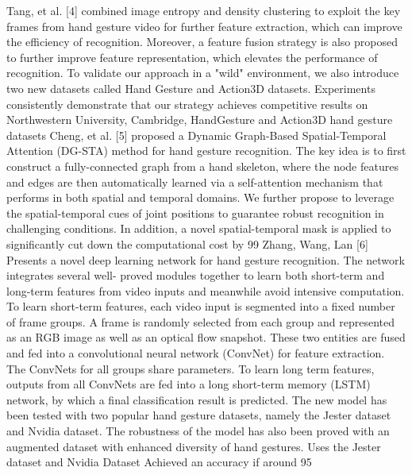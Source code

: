 \documentclass[oneside,a4paper,12pt]{report}
\begin{document}
    Tang, et al. [4] combined image entropy and density clustering to exploit the key frames from hand gesture video for further feature extraction, which can improve the efficiency of recognition. Moreover, a feature fusion strategy is also proposed to further improve feature representation, which elevates the performance of recognition. To validate our approach in a "wild" environment, we also introduce two new datasets called Hand Gesture and Action3D datasets. Experiments consistently demonstrate that our strategy achieves competitive results on Northwestern University, Cambridge, HandGesture and Action3D hand gesture datasets
    Cheng, et al. [5] proposed a Dynamic Graph-Based Spatial-Temporal Attention (DG-STA) method for hand gesture recognition. The key idea is to first construct a fully-connected graph from a hand skeleton, where the node features and edges are then automatically learned via a self-attention mechanism that performs in both spatial and temporal domains. We further propose to leverage the spatial-temporal cues of joint positions to guarantee robust recognition in challenging conditions. In addition, a novel spatial-temporal mask is applied to significantly cut down the computational cost by 99%
    Zhang, Wang, Lan [6] Presents a novel deep learning network for hand gesture recognition. The network integrates several well- proved modules together to learn both short-term and long-term features from video inputs and meanwhile avoid intensive computation. To learn short-term features, each video input is segmented into a fixed number of frame groups. A frame is randomly selected from each group and represented as an RGB image as well as an optical flow snapshot. These two entities are fused and fed into a convolutional neural network (ConvNet) for feature extraction. The ConvNets for all groups share parameters. To learn long term features, outputs from all ConvNets are fed into a long short-term memory (LSTM) network, by which a final classification result is predicted. The new model has been tested with two popular hand gesture datasets, namely the Jester dataset and Nvidia dataset. The robustness of the model has also been proved with an augmented dataset with enhanced diversity of hand gestures. Uses the Jester dataset and Nvidia Dataset Achieved an accuracy if around 95%
\end{document}

